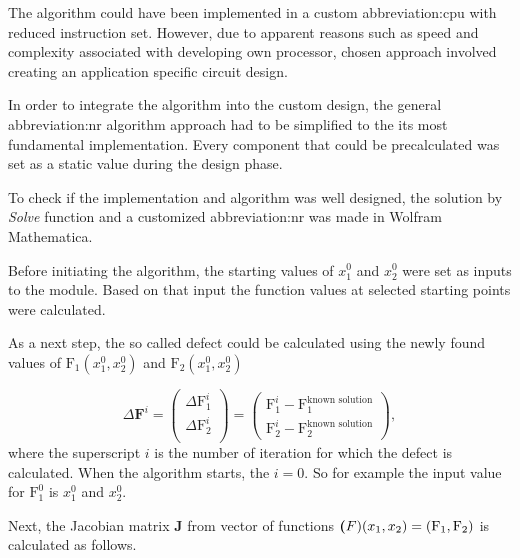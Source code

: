 \documentclass[a4paper, twoside, 11pt]{article}
\begin{document}
        \par
        The algorithm could have been implemented in a custom \gls{abbreviation:cpu} with reduced instruction set. However, due to apparent reasons such as speed and complexity associated with developing own processor, chosen approach involved creating an application specific circuit design.\par
        In order to integrate the algorithm into the custom design, the general \gls{abbreviation:nr} algorithm approach had to be simplified to the its most fundamental implementation. Every component that could be precalculated was set as a static value during the design phase.\par
        To check if the implementation and algorithm was well designed, the solution by \textit{Solve} function and a customized \gls{abbreviation:nr} was made in Wolfram Mathematica.\par
        Before initiating the algorithm, the starting values of $x_1^0$ and $x_2^0$ were set as inputs to the module. Based on that input the function values at selected starting points were calculated.\par
        As a next step, the so called defect could be calculated using the newly found values of $\text{F}_1 (x_1^0, x_2^0)$ and $\text{F}_2 (x_1^0, x_2^0)$

        \begin{equation}
            \Delta \textbf{F}^i =
            \begin{pmatrix}
                \Delta \text{F}_1^i\\
                \Delta \text{F}_2^i\\
            \end{pmatrix}
            =
            \begin{pmatrix}
                \text{F}_1^i - \text{F}_1^{\text{known solution}}\\
                \text{F}_2^i - \text{F}_2^{\text{known solution}}
            \end{pmatrix},
        \end{equation}
        where the superscript $i$ is the number of iteration for which the defect is calculated. When the algorithm starts, the $i = 0$. So for example the input value for $\text{F}_1^0$ is $x_1^0$ and $x_2^0$.\par
        Next, the Jacobian matrix \textbf{J} from vector of functions $\textbf(F)(x_1, x_2) = (\text{F}_1, \text{F}_2)$ is calculated as follows.
\end{document}

